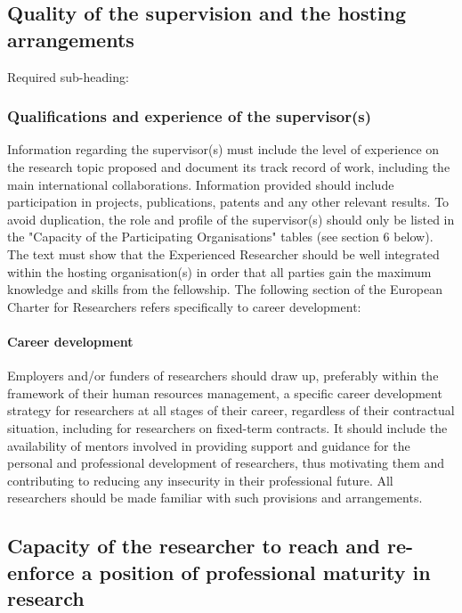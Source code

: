 \subsection{Quality of the supervision and the hosting arrangements}
\label{sec:supervision}

Required sub-heading:
\subsubsection*{Qualifications and experience of the supervisor(s)}

Information regarding the supervisor(s) must include the level of experience on the research topic proposed and document its track record of work, including the main international collaborations. Information provided should include participation in projects, publications, patents and any other relevant results.
To avoid duplication, the role and profile of the supervisor(s) should only be listed in the "Capacity of the Participating Organisations" tables (see section 6 below).
The text must show that the Experienced Researcher should be well integrated within the hosting organisation(s) in order that all parties gain the maximum knowledge and skills from the fellowship.
The following section of the European Charter for Researchers refers specifically to career development:

\paragraph{Career development}
Employers and/or funders of researchers should draw up, preferably within the framework of their human resources management, a specific career development strategy for researchers at all stages of their career, regardless of their contractual situation, including for researchers on fixed-term contracts. It should include the availability of mentors involved in providing support and guidance for the personal and professional development of researchers, thus motivating them and contributing to reducing any insecurity in their professional future. All researchers should be made familiar with such provisions and arrangements.

\subsection{Capacity of the researcher to reach and re-enforce a position of professional maturity in research}
\label{sec:maturity}

